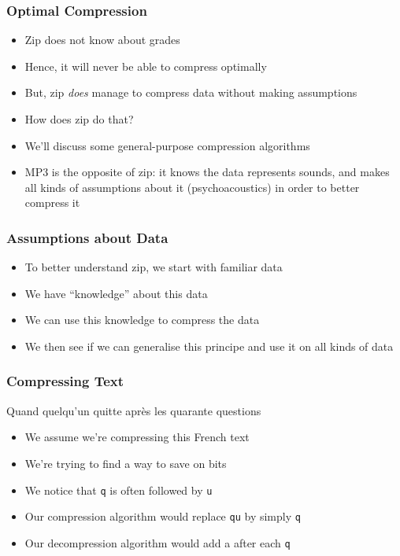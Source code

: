 \documentclass{../ucll-slides}
\begin{document}
\begin{frame}
  \frametitle{Optimal Compression}
  \begin{itemize}
    \item Zip does not know about grades
    \item Hence, it will never be able to compress optimally
    \item But, zip \emph{does} manage to compress data without making assumptions
    \item How does zip do that?
    \item We'll discuss some general-purpose compression algorithms
    \item MP3 is the opposite of zip: it knows the data represents sounds,
          and makes all kinds of assumptions about it (psychoacoustics)
          in order to better compress it
  \end{itemize}
\end{frame}

\begin{frame}
  \frametitle{Assumptions about Data}
  \begin{itemize}
    \item To better understand zip, we start with familiar data
    \item We have ``knowledge'' about this data
    \item We can use this knowledge to compress the data
    \item We then see if we can generalise this principe and use
          it on all kinds of data
  \end{itemize}
\end{frame}

\begin{frame}
  \frametitle{Compressing Text}
  \begin{center}
    Quand quelqu'un quitte apr\`es les quarante questions
  \end{center}
  \begin{itemize}
    \item We assume we're compressing this French text
    \item We're trying to find a way to save on bits
    \item We notice that {\tt q} is often followed by {\tt u}
    \item Our compression algorithm would replace {\tt qu} by simply {\tt q}
    \item Our decompression algorithm would add a {\tt } after each {\tt q}
  \end{itemize}
\end{frame}
\end{document}
